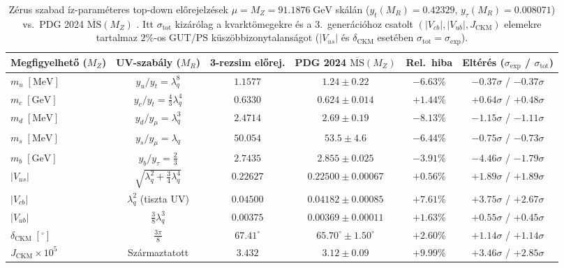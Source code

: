 \documentclass[11pt,a4paper]{article}
\begin{document}
\begin{table}[htbp]
\centering
\caption{Zérus szabad íz-paraméteres top-down előrejelzések $\mu = M_Z = 91.1876\;\mathrm{GeV}$ skálán ($y_t(M_R) = 0.42329$, $y_\tau(M_R) = 0.008071$) vs.\ PDG 2024 $\overline{\mathrm{MS}}(M_Z)$ \cite{PDG2024,HuangZhou2021}. Itt $\sigma_{\mathrm{tot}}$ kizárólag a kvarktömegekre és a 3.\ generációhoz csatolt $(|V_{cb}|, |V_{ub}|, J_{\mathrm{CKM}})$ elemekre tartalmaz $2\%$-os GUT/PS küszöbbizonytalanságot ($|V_{us}|$ és $\delta_{\mathrm{CKM}}$ esetében $\sigma_{\mathrm{tot}} = \sigma_{\mathrm{exp}}$).}
\label{tab:mz_hu}
\vspace{0.35em}
\setlength{\tabcolsep}{4.2pt}
\footnotesize
\begin{tabular}{lccccc}
\toprule
Megfigyelhető ($M_Z$) & UV-szabály ($M_R$) & 3-rezsim előrej. & PDG 2024 $\overline{\mathrm{MS}}(M_Z)$ & Rel.\ hiba & Eltérés ($\sigma_{\mathrm{exp}}$ / $\sigma_{\mathrm{tot}}$) \\
\midrule
$m_u\;[\mathrm{MeV}]$ & $y_u/y_t = \lambda_q^8$ & $1.1577$ & $1.24 \pm 0.22$ & $-6.63\%$ & $-0.37\sigma$ / $-0.37\sigma$ \\
$m_c\;[\mathrm{GeV}]$ & $y_c/y_t = \frac{4}{3}\lambda_q^4$ & $0.6330$ & $0.624 \pm 0.014$ & $+1.44\%$ & $+0.64\sigma$ / $+0.48\sigma$ \\
$m_d\;[\mathrm{MeV}]$ & $y_d/y_\mu = \lambda_q^3$ & $2.4714$ & $2.69 \pm 0.19$ & $-8.13\%$ & $-1.15\sigma$ / $-1.11\sigma$ \\
$m_s\;[\mathrm{MeV}]$ & $y_s/y_\mu = \lambda_q$ & $50.054$ & $53.5 \pm 4.6$ & $-6.44\%$ & $-0.75\sigma$ / $-0.73\sigma$ \\
$m_b\;[\mathrm{GeV}]$ & $y_b/y_\tau = \frac{2}{3}$ & $2.7435$ & $2.855 \pm 0.025$ & $-3.91\%$ & $-4.46\sigma$ / $-1.79\sigma$ \\
\midrule
$|V_{us}|$ & $\sqrt{\lambda_q^2 + \frac{3}{4}\lambda_q^4}$ & $0.22627$ & $0.22500 \pm 0.00067$ & $+0.56\%$ & $+1.89\sigma$ / $+1.89\sigma$ \\
$|V_{cb}|$ & $\lambda_q^2$ (tiszta UV) & $0.04500$ & $0.04182 \pm 0.00085$ & $+7.61\%$ & $+3.75\sigma$ / $+2.67\sigma$ \\
$|V_{ub}|$ & $\frac{3}{8}\lambda_q^3$ & $0.00375$ & $0.00369 \pm 0.00011$ & $+1.63\%$ & $+0.55\sigma$ / $+0.45\sigma$ \\
$\delta_{\mathrm{CKM}}\;[^\circ]$ & $\frac{3\pi}{8}$ & $67.41^\circ$ & $65.70^\circ \pm 1.50^\circ$ & $+2.60\%$ & $+1.14\sigma$ / $+1.14\sigma$ \\
$J_{\mathrm{CKM}}\times 10^5$ & Származtatott & $3.432$ & $3.12 \pm 0.09$ & $+9.99\%$ & $+3.46\sigma$ / $+2.85\sigma$ \\
\bottomrule
\end{tabular}
\end{table}
\end{document}
